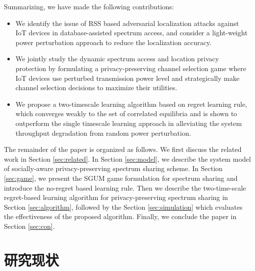 Summarizing, we have made the following contributions:
\begin{itemize}
\item We identify the issue of RSS based adversarial localization attacks against IoT devices in database-assisted spectrum access, and consider a light-weight power perturbation approach to reduce the localization accuracy.
\item We jointly study the dynamic spectrum access and location privacy protection by formulating a privacy-preserving channel selection game where IoT devices use perturbed transmission power level and strategically make channel selection decisions to maximize their utilities.
\item We propose a two-timescale learning algorithm based on regret learning rule, which converges weakly to the set of correlated equilibria and is shown to outperform the single timescale learning approach in alleviating the system throughput degradation from random power perturbation.
\end{itemize}

The remainder of the paper is organized as follows. We first discuss the related work in Section \ref{sec:related}. In Section \ref{sec:model}, we describe the system model of socially-aware privacy-preserving spectrum sharing scheme. In Section \ref{sec:game}, we present the SGUM game formulation for spectrum sharing and introduce the no-regret based learning rule. Then we describe the two-time-scale regret-based learning algorithm for privacy-preserving spectrum sharing in Section \ref{sec:algorithm}, followed by the Section \ref{sec:simulation} which evaluates the effectiveness of the proposed algorithm. Finally, we conclude the paper in Section \ref{sec:con}.

\section{研究现状}

